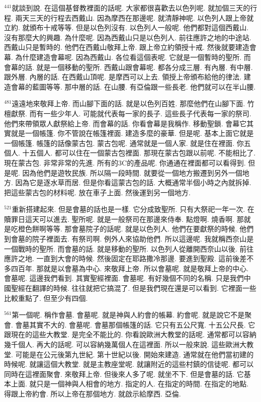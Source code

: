 \documentclass{book}
\begin{document}
$^{441}$就談到說.
在這個基督教裡面的話呢.
大家都很喜歡去以色列呢.
就加個三天的行程.
兩天三天的行程去西戴山.
因為摩西在那邊呢.
就清靜神呢.
以色列人跟上帝就立約.
就頒布十戒等等.
但是以色列沒有.
以色列人一般呢.
他們都對這個西戴山.
沒有那麼大的興趣.
為什麼呢.
因為西戴山只是以色列人.
前往應許之地的中途站.
西戴山只是暫時的.
他們在西戴山敬拜上帝.
跟上帝立約領授十戒.
然後就要建造會幕.
為什麼建造會幕呢.
因為西戴山.
各位看這個表呢.
它就是一個暫時的聖所.
而會幕的話.
就是一個移動的聖所.
西戴山跟會幕呢.
都各分成三層.
有內層.
有中層.
跟外層.
內層的話.
在西戴山頂呢.
是摩西可以上去.
領授上帝頒布給他的律法.
建造會幕的藍圖等等.
那中層的話.
在山腰.
有亞倫跟一些長老.
他們就可以在半山腰.

$^{481}$遠遠地來敬拜上帝.
而山腳下面的話.
就是以色列百姓.
那麼他們在山腳下面.
竹檀獻祭.
而有一些少年人.
可能就代表每一家的長子.
這些長子代表每一家的祭司.
他們來帶領眾人獻祭給上帝.
而會幕的話.
你看會幕是我稱作.
移動聖鎖.
會幕它其實就是一個帳篷.
你不管說在帳篷裡面.
建造多麼的豪華.
但是呢.
基本上面它就是一個帳篷.
帳篷的話像蒙古包.
蒙古包呢.
通常就是一個人家.
就是住在裡面.
你五個人.
十五個人.
都可以住在一個蒙古包裡面.
那現在蒙古包跟以前呢.
不能相比了.
現在蒙古包.
非常非常的先進.
所有的3C的產品呢.
你通通在裡面都可以看得到.
但是呢.
因為他們是遊牧民族.
所以隔一段時間.
就要從一個地方搬遷到另外一個地方.
因為它是逐水草而居.
但是你看這蒙古包的話.
大概通常半個小時之內就拆掉.
把這些蒙古包的材料呢.
放在車子上面.
然後運到另一個地方.

$^{521}$重新搭建起來.
但是會墓的話也是一樣.
它分成致聖所.
只有大祭祀一年一次.
在贖罪日這天可以進去.
聖所呢.
就是一般祭司在那邊來侍奉.
點燈啊.
燒香啊.
那就是吃橙色餅啊等等.
那會墓院子的話呢.
就是以色列人.
他們在要獻祭的時候.
他們到會墓的院子裡面去.
有祭司啊.
例外人來協助他們.
所以這邊呢.
我就稱西奈山是一個戰時的聖所.
而會墓的話.
就是移動的聖所.
以色列人從離開西奈山以後.
前往應許之地.
一直到大會的時候.
然後固定在耶路撒冷那邊.
要進到聖殿.
這前後差不多四百年.
那就是以會墓為中心.
來敬拜上帝.
所以會墓呢.
就是敬拜上帝的中心.
會墓呢.
這邊我們看到.
其實聖經裡面.
會墓呢.
有好幾個不同的名稱.
只是我們中國聖經在翻譯的時候.
往往就把它搞混了.
但是我們現在還是可以看到.
它裡面一些比較重點了.
但至少有四個.

$^{561}$第一個呢.
稱作會墓.
會墓呢.
就是神與人約會的帳幕.
約會呢.
就是說它不是聚會.
會墓其實不大的.
會墓呢.
會墓那個帳篷的話.
它只有五公尺寬.
十五公尺長.
它跟現在的這些大教堂.
是完全不能比的.
你看說歐洲大教堂的話呢.
通常都可以容納幾千個人.
再大的話呢.
可以容納幾萬個人在這裡面.
所以一般來說.
這些歐洲大教堂.
可能是在公元後第九世紀.
第十世紀以後.
開始來建造.
通常就在他們當初建的時候呢.
就讓這個大教堂.
就是主教座堂呢.
就讓附近的這些村鎮的信徒呢.
都可以同時在這裡面聚會.
來敬拜上帝.
但後來人多了呢.
就坐不下.
但是會墓的話.
它基本上面.
就只是一個神與人相會的地方.
指定的人.
在指定的時間.
在指定的地點.
得跟上帝約會.
所以上帝在那個地方.
就啟示給摩西.
亞倫.
\end{document}

